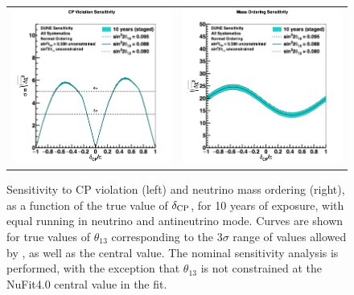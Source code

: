 \begin{figure}[h!]
    \centering
    \begin{tabular}{cc}
		\includegraphics[width=0.475\linewidth]{graphics/cpv_varyth13_2019_v4.png} &
		\includegraphics[width=0.475\linewidth]{graphics/mh_varyth13_2019_v4.png}
	\end{tabular}
	\caption[Sensitivity to CP violation and neutrino mass ordering, as a function of $\deltacp$]{Sensitivity to CP violation (left) and neutrino mass ordering (right), as a function of the true value of $\deltacp$, for 10 years of exposure, with equal running in neutrino and antineutrino mode. Curves are shown for true values of $\theta_{13}$ corresponding to the 3$\sigma$ range of values allowed by , as well as the  central value. The nominal sensitivity analysis is performed, with the exception that $\theta_{13}$ is not constrained at the NuFit4.0 central value in the fit.}
    \label{fig:th13var}
\end{figure}

